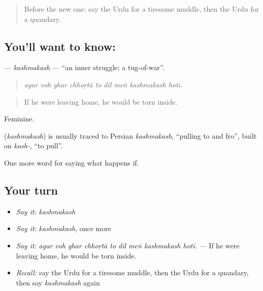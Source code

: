 \label{lesson:UR-C529-kashmakash}



\begin{quote}
Before the new one: say the Urdu for a tiresome muddle, then the Urdu for a quandary.
\end{quote}

\subsection*{You'll want to know: }
\textbf{} — \emph{kashmakash} — \textquotedblleft{}an inner struggle; a tug-of-war\textquotedblright{}.

\begin{quote}
        
\end{quote}

\begin{quote}
\emph{agar voh ghar chhoṛtā to dil meṅ kashmakash hotī.}
\end{quote}

\begin{quote}
If he were leaving home, he would be torn inside.
\end{quote}

Feminine.

\begin{cousinweb}
\textbf{} (\emph{kashmakash}) is usually traced to Persian \emph{kashmakash}, \textquotedblleft{}pulling to and fro\textquotedblright{}, built on \emph{kash-}, \textquotedblleft{}to pull\textquotedblright{}.
\end{cousinweb}

\begin{grammarlens}[title={What you've built}]
One more word for saying what happens if.
\end{grammarlens}

\subsection*{Your turn}
\begin{itemize}
\raggedright
  \item \emph{Say it:} \emph{kashmakash}
  \item \emph{Say it:} \emph{kashmakash}, once more
  \item \emph{Say it:} \emph{agar voh ghar chhoṛtā to dil meṅ kashmakash hotī.} — If he were leaving home, he would be torn inside.
  \item \emph{Recall:} say the Urdu for a tiresome muddle, then the Urdu for a quandary, then say \emph{kashmakash} again
\end{itemize}


